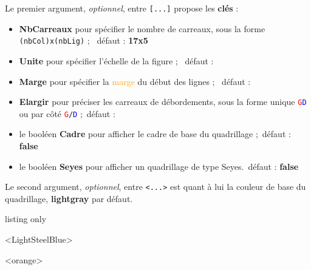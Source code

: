 \documentclass[a4paper]{article}
\newcommand\Cle[1]{{\bfseries\sffamily\textlangle #1\textrangle}}
\begin{document}
Le premier argument, \textit{optionnel}, entre \texttt{[...]} propose les \Cle{clés} :

\begin{itemize}
	\item \Cle{NbCarreaux} pour spécifier le nombre de carreaux, sous la forme \texttt{(nbCol)x(nbLig)} ; \hfill~défaut : \Cle{17x5}
	\item \Cle{Unite} pour spécifier l'échelle de la figure ; \hfill~défaut : \Cle{1}
	\item \Cle{Marge} pour spécifier la \textcolor{orange}{marge} du début des lignes ; \hfill~défaut : \Cle{0}
	\item \Cle{Elargir} pour préciser les carreaux de débordements, sous la forme unique \texttt{\textcolor{red}{G}\textcolor{blue}{D}} ou par côté \texttt{\textcolor{red}{G}/\textcolor{blue}{D}} ;\hfill~défaut : \Cle{0}
	\item le booléen \Cle{Cadre} pour afficher le cadre de base du quadrillage ;\hfill~défaut : \Cle{false}
	\item le booléen \Cle{Seyes} pour afficher un quadrillage de type Seyes.\hfill~défaut : \Cle{false}
\end{itemize}

Le second argument, \textit{optionnel}, entre \texttt{<...>} est quant à lui la couleur de base du quadrillage, \Cle{lightgray} par défaut.

\medskip

\begin{PresentationCode}{listing only}

\begin{EnvQuadrillage}[NbCarreaux=30x5]
\end{EnvQuadrillage}

\begin{EnvQuadrillage}[NbCarreaux=36x8,Elargir=3/3]<LightSteelBlue>
\end{EnvQuadrillage}

\begin{center}
	\begin{EnvQuadrillage}[NbCarreaux=15x5,Elargir=1/2,Seyes]<orange>
	\end{EnvQuadrillage}
\end{center}
\end{PresentationCode}
\end{document}

